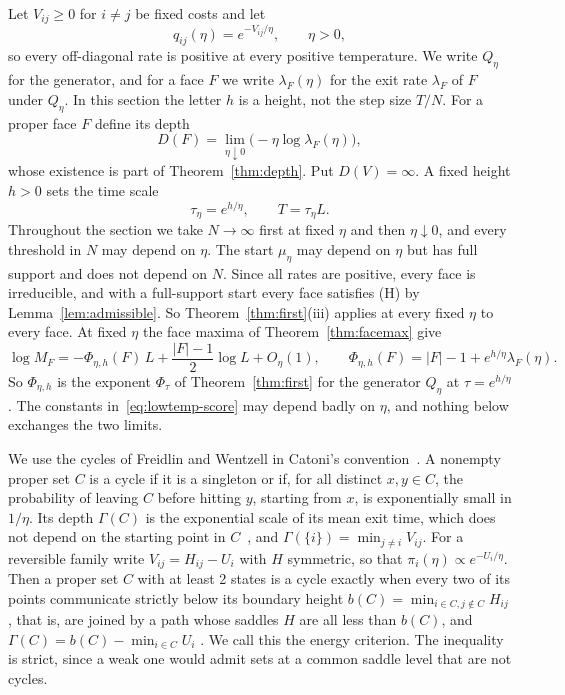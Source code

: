 Let $V_{ij}\ge0$ for $i\ne j$ be fixed costs and let
\[
 q_{ij}(\eta)=e^{-V_{ij}/\eta},\qquad \eta>0,
\]
so every off-diagonal rate is positive at every positive temperature. We
write $Q_\eta$ for the generator, and for a face $F$ we write $\lambda_F(\eta)$
for the exit rate $\lambda_F$ of $F$ under $Q_\eta$. In this section the
letter $h$ is a height, not the step size $T/N$. For a proper face $F$ define
its depth
\[
 D(F)=\lim_{\eta\downarrow0}\bigl(-\eta\log \lambda_F(\eta)\bigr),
\]
whose existence is part of Theorem~\ref{thm:depth}. Put $D(V)=\infty$. A fixed
height $h>0$ sets the time scale
\[
 \tau_\eta=e^{h/\eta},\qquad T=\tau_\eta L.
\]
Throughout the section we take $N\to\infty$ first at fixed $\eta$ and then
$\eta\downarrow0$, and every threshold in $N$ may depend on $\eta$. The start
$\mu_\eta$ may depend on $\eta$ but has full support and does not depend on
$N$. Since all rates are positive, every face is irreducible, and with a
full-support start every face satisfies (H) by Lemma~\ref{lem:admissible}.
So Theorem~\ref{thm:first}(iii) applies at every fixed $\eta$ to every face.
At fixed $\eta$ the face maxima of Theorem~\ref{thm:facemax} give
\begin{equation}\label{eq:lowtemp-score}
 \log M_F=-\Phi_{\eta,h}(F)\,L+\frac{|F|-1}2\log L+O_\eta(1),\qquad
 \Phi_{\eta,h}(F)=|F|-1+e^{h/\eta}\lambda_F(\eta).
\end{equation}
So $\Phi_{\eta,h}$ is the exponent $\Phi_\tau$ of Theorem~\ref{thm:first} for the
generator $Q_\eta$ at $\tau=e^{h/\eta}$. The constants in~\eqref{eq:lowtemp-score}
may depend badly on $\eta$, and nothing below exchanges the two limits.

We use the cycles of Freidlin and Wentzell in Catoni's
convention~\cite[Definition~4.2]{catoni1999}. A nonempty
proper set $C$ is a cycle if it is a singleton or if, for all distinct
$x,y\in C$, the probability of leaving $C$ before hitting $y$, starting from
$x$, is exponentially small in $1/\eta$. Its depth $\Gamma(C)$ is the
exponential scale of its mean exit time, which does not depend on the
starting point in $C$~\cite[Proposition~4.6]{catoni1999}, and
$\Gamma(\{i\})=\min_{j\ne i}V_{ij}$.
For a reversible family write $V_{ij}=H_{ij}-U_i$ with $H$ symmetric, so that
$\pi_i(\eta)\propto e^{-U_i/\eta}$. Then a proper set $C$ with at least 2 states
is a cycle exactly when every two of its points communicate strictly below its
boundary height $b(C)=\min_{i\in C,j\notin C}H_{ij}$, that is, are joined by a
path whose saddles $H$ are all less than $b(C)$, and $\Gamma(C)=b(C)-\min_{i\in C}U_i$
\cite[Definition~3.5, Propositions~3.10 and~3.15]{cirillonardisohier2015}.
We call this the energy criterion. The inequality is strict, since a weak one
would admit sets at a common saddle level that are not cycles.

